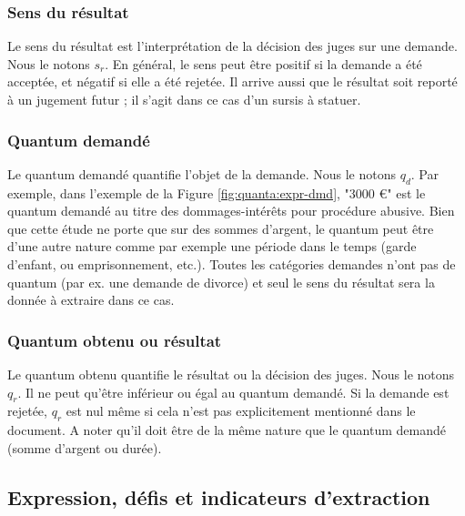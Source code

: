 \subsubsection{Sens du résultat}

Le sens du résultat est l'interprétation de la décision des juges sur une demande. Nous le notons $s_r$. En général, le sens peut être positif si la demande a été acceptée, et négatif si elle a été rejetée. Il arrive aussi que le résultat soit reporté à un jugement futur ; il s'agit dans ce cas d'un sursis à statuer. 

\subsubsection{Quantum demandé}

Le quantum demandé quantifie l'objet de la demande. Nous le notons $q_d$. Par exemple, dans l'exemple de la Figure \ref{fig:quanta:expr-dmd}, "3000 \euro{}" est le quantum demandé au titre des dommages-intérêts pour procédure abusive. Bien que cette étude ne porte que sur des sommes d'argent, le quantum peut être d'une autre nature comme par exemple une période dans le temps (garde d'enfant, ou emprisonnement, etc.). Toutes les catégories demandes n'ont pas de quantum (par ex. une demande de divorce) et seul le sens du résultat sera la donnée à extraire dans ce cas.


\subsubsection{Quantum obtenu ou résultat}

Le quantum obtenu quantifie le résultat ou la décision des juges. Nous le notons $q_r$. Il ne peut qu'être inférieur ou égal au quantum demandé. Si la demande est rejetée, 
$q_r$ est nul même si cela n'est pas explicitement mentionné dans le document. A noter qu'il doit être de la même nature que le quantum demandé (somme d'argent ou durée).


\subsection{Expression, défis et indicateurs d'extraction}

